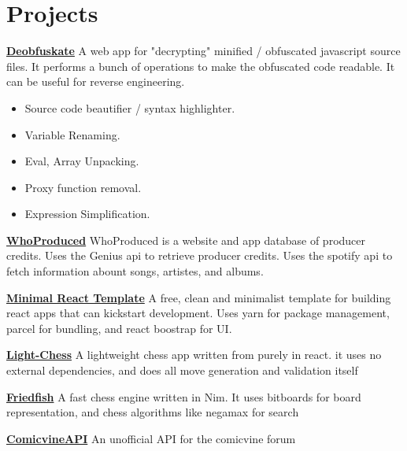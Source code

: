 \section{Projects}
\begin{experience}{\href{https://deminifyjs.netlify.app/}{\textbf{Deobfuskate}}}{
}
A web app for "decrypting" minified / obfuscated javascript source files.
It performs a bunch of operations to make the obfuscated code readable.
It can be useful for reverse engineering.
\begin{itemize}
	\item Source code beautifier / syntax highlighter.
	\item Variable Renaming.
	\item Eval, Array Unpacking.
	\item Proxy function removal.
	\item Expression Simplification.
\end{itemize}
\end{experience}

\begin{experience}{\href{http://whoproduced.herokuapp.com}{\textbf{WhoProduced}}}{
}
WhoProduced is a website and app database of producer credits.
Uses the Genius api to retrieve producer credits.
Uses the spotify api to fetch information abount songs, artistes, and albums.

\end{experience}

\begin{experience}{\href{https://github.com/foderking/Minimal-React-Template.git}{\textbf{Minimal React Template}}}{
}
A free, clean and minimalist template for building react apps that can kickstart development.
Uses yarn for package management, parcel for bundling, and react boostrap for UI.

\end{experience}


\begin{experience}{\href{https://light-chess.netlify.app/}{\textbf{Light-Chess}}}{
}
A lightweight chess app written from purely in react.
it uses no external dependencies, and does all move generation and validation itself

\end{experience}


\begin{experience}{\href{https://github.com/foderking/Friedfish}{\textbf{Friedfish}}}{
}
A fast chess engine written in Nim.
It uses bitboards for board representation, and chess algorithms like negamax for search

\end{experience}


\begin{experience}{\href{https://github.com/foderking/ComicvineAPI}{\textbf{ComicvineAPI}}}{
}
An unofficial API for the comicvine forum

\end{experience}




